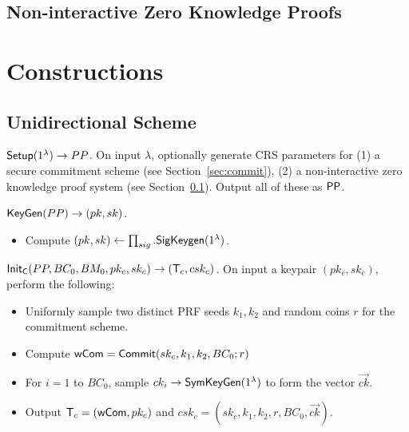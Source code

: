 \documentclass[10pt]{report}
\begin{document}

\subsection{Non-interactive Zero Knowledge Proofs}
\label{sec:nizkp}



\section{Constructions}
\label{sec:constructs}

\subsection{Unidirectional Scheme}
\label{sec:unidirectional}


\medskip \noindent
${\sf Setup}(1^\lambda) \rightarrow PP$. On input $\lambda$, optionally generate CRS parameters for (1) a secure commitment scheme (see Section~\ref{sec:commit}), (2) a non-interactive zero knowledge proof system (see Section~\ref{sec:nizkp}). Output all of these as ${\sf PP}$.

\medskip \noindent
${\sf KeyGen}(PP) \rightarrow (pk, sk)$. 
\begin{itemize}
\item Compute $(pk, sk) \leftarrow \prod_{sig}.{\sf SigKeygen}(1^\lambda)$. %
\end{itemize}

\medskip \noindent
${\sf Init_{C}}(PP, BC_{0}, BM_{0}, pk_c, sk_c) \rightarrow ({\sf T}_c, csk_c)$. On input a keypair $(pk_c, sk_c)$, perform the following:

\begin{itemize} 
\item Uniformly sample two distinct PRF seeds $k_1, k_2$ and random coins $r$ for the commitment scheme. 
\item Compute ${\sf wCom} = {\sf Commit}(sk_c, k_1, k_2, BC_{0}; r)$
\item For $i = 1$ to $BC_0$, sample $ck_i \rightarrow {\sf SymKeyGen}(1^\lambda)$ to form the vector $\vec{ck}$. 
\item Output ${\sf T}_c = ({\sf wCom}, pk_c)$ and $csk_c = (sk_c, k_1, k_2, r, BC_{0}, \vec{ck})$.
\end{itemize}
\end{document}
